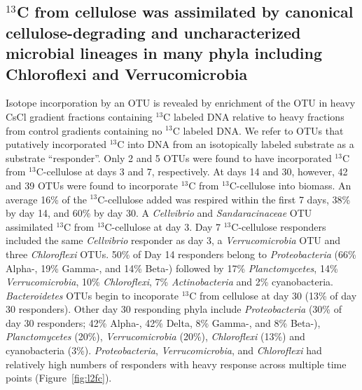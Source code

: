 \subsection{$^{13}$C from cellulose was assimilated by canonical
cellulose-degrading and uncharacterized microbial lineages in many phyla
including Chloroflexi and Verrucomicrobia} 
Isotope incorporation by an OTU is revealed by enrichment of the OTU in heavy
CsCl gradient fractions containing $^{13}$C labeled DNA relative to heavy
fractions from control gradients containing no $^{13}$C labeled DNA. We refer
to OTUs that putatively incorporated $^{13}$C into DNA from an isotopically
labeled substrate as a substrate ``responder''. Only 2 and 5 OTUs were found to
have incorporated $^{13}$C from $^{13}$C-cellulose at days 3 and 7,
respectively. At days 14 and 30, however, 42 and 39 OTUs were found to
incorporate $^{13}$C from $^{13}$C-cellulose into biomass. An average 16\% of
the $^{13}$C-cellulose added was respired within the first 7 days, 38\% by day
14, and 60\% by day 30.  A \textit{Cellvibrio} and \textit{Sandaracinaceae} OTU
assimilated $^{13}$C from $^{13}$C-cellulose at day 3. Day 7 $^{13}$C-cellulose
responders included the same \textit{Cellvibrio} responder as day 3, a
\textit{Verrucomicrobia} OTU and three \textit{Chloroflexi} OTUs.  50\% of Day
14 responders belong to \textit{Proteobacteria} (66\% Alpha-, 19\% Gamma-, and
14\% Beta-) followed by 17\% \textit{Planctomycetes}, 14\%
\textit{Verrucomicrobia}, 10\% \textit{Chloroflexi}, 7\%
\textit{Actinobacteria} and 2\% cyanobacteria.  \textit{Bacteroidetes} OTUs
begin to incoporate $^{13}$C from cellulose at day 30 (13\% of day 30
responders). Other day 30 responding phyla include \textit{Proteobacteria}
(30\% of day 30 responders; 42\% Alpha-, 42\% Delta, 8\% Gamma-, and 8\%
Beta-), \textit{Planctomycetes} (20\%), \textit{Verrucomicrobia} (20\%),
\textit{Chloroflexi} (13\%) and cyanobacteria (3\%). \textit{Proteobacteria},
\textit{Verrucomicrobia}, and \textit{Chloroflexi} had relatively high numbers
of responders with heavy response across multiple time points
(Figure~\ref{fig:l2fc}).

